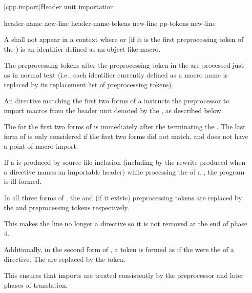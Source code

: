 [cpp.import]{Header unit importation}
%
%
%

\begin{bnf}
\br
      header-name  \terminal{;} new-line\br
      header-name-tokens  \terminal{;} new-line\br
      pp-tokens \terminal{;} new-line
\end{bnf}

\pnum
A  shall not
appear in a context where 
or (if it is the first preprocessing token of the ) 
is an identifier defined as an object-like macro.

\pnum
The preprocessing tokens after the  preprocessing token
in the  
are processed just as in normal text
(i.e., each identifier currently defined as a macro name
is replaced by its replacement list of preprocessing tokens).
\begin{note}
An  directive
matching the first two forms of a 
instructs the preprocessor to import macros
from the header unit
denoted by the ,
as described below.
\end{note}
%
The  for the
first two forms of  is
immediately after the  terminating
the .
The last form of  is only considered
if the first two forms did not match, and
does not have a point of macro import.

\pnum
If a  is produced by source file inclusion
(including by the rewrite produced
when a  directive names an importable header)
while processing the  of a ,
the program is ill-formed.

\pnum
In all three forms of ,
the  and  (if it exists) preprocessing tokens
are replaced by the  and
 preprocessing tokens respectively.
\begin{note}
This makes the line no longer a directive
so it is not removed at the end of phase 4.
\end{note}
Additionally, in the second form of ,
a  token is formed as if
the 
were the  of a  directive.
The  are replaced by
the  token.
\begin{note}
This ensures that imports are treated consistently by
the preprocessor and later phases of translation.
\end{note}

